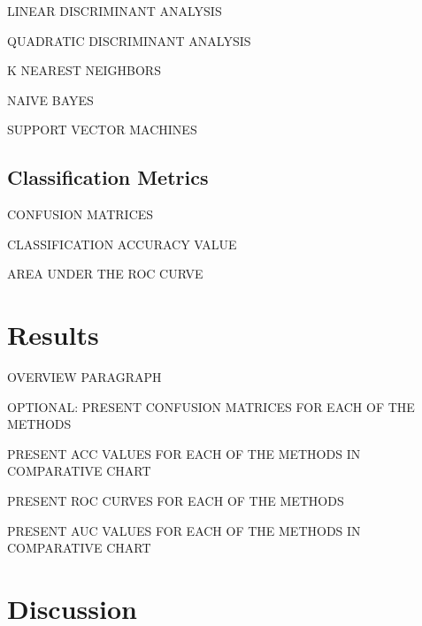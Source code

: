 \documentclass[12pt]{article}
\begin{document}
LINEAR DISCRIMINANT ANALYSIS

QUADRATIC DISCRIMINANT ANALYSIS 

K NEAREST NEIGHBORS

NAIVE BAYES

SUPPORT VECTOR MACHINES

\subsection{Classification Metrics}
\label{sec:metr}

CONFUSION MATRICES

CLASSIFICATION ACCURACY VALUE

AREA UNDER THE ROC CURVE

\section{Results}
\label{sec:resu}

OVERVIEW PARAGRAPH

OPTIONAL: PRESENT CONFUSION MATRICES FOR EACH OF THE METHODS

PRESENT ACC VALUES FOR EACH OF THE METHODS IN COMPARATIVE CHART

PRESENT ROC CURVES FOR EACH OF THE METHODS

PRESENT AUC VALUES FOR EACH OF THE METHODS IN COMPARATIVE CHART

\section{Discussion}
\label{sec:disc}







\end{document}
